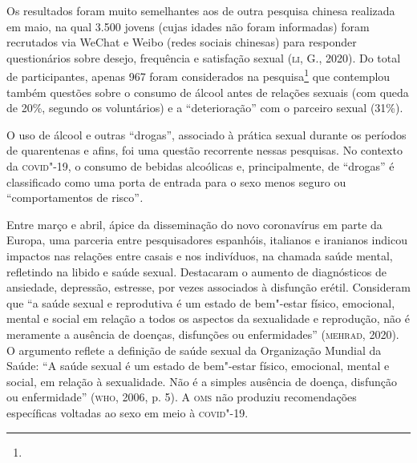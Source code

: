 Os resultados foram muito semelhantes aos de outra pesquisa chinesa
realizada em maio, na qual 3.500 jovens (cujas idades não foram
informadas) foram recrutados via WeChat e Weibo (redes sociais chinesas)
para responder questionários sobre desejo, frequência e satisfação
sexual (\textsc{li}, G., 2020). Do total de participantes, apenas 967 foram
considerados na pesquisa\footnote{} que
contemplou também questões sobre o consumo de álcool antes de relações
sexuais (com queda de 20\%, segundo os voluntários) e a ``deterioração''
com o parceiro sexual (31\%).

O uso de álcool e outras ``drogas'', associado à prática sexual durante
os períodos de quarentenas e afins, foi uma questão recorrente nessas
pesquisas. No contexto da \textsc{covid}"-19, o consumo de bebidas alcoólicas e,
principalmente, de ``drogas'' é classificado como uma porta de entrada
para o sexo menos seguro ou ``comportamentos de risco''\emph{. }

Entre março e abril, ápice da disseminação do novo coronavírus em parte
da Europa, uma parceria entre pesquisadores espanhóis, italianos e
iranianos indicou impactos nas relações entre casais e nos indivíduos,
na chamada saúde mental, refletindo na libido e saúde sexual. Destacaram
o aumento de diagnósticos de ansiedade, depressão, estresse, por vezes
associados à disfunção erétil. Consideram que ``a saúde sexual e
reprodutiva é um estado de bem"-estar físico, emocional, mental e social
em relação a todos os aspectos da sexualidade e reprodução, não é
meramente a ausência de doenças, disfunções ou enfermidades'' (\textsc{mehrad},
2020). O argumento reflete a definição de saúde sexual da Organização
Mundial da Saúde: ``A saúde sexual é um estado de bem"-estar físico,
emocional, mental e social, em relação à sexualidade. Não é a simples
ausência de doença, disfunção ou enfermidade'' (\textsc{who}, 2006, p. 5). A \textsc{oms}
não produziu recomendações específicas voltadas ao sexo em meio à
\textsc{covid}"-19.

